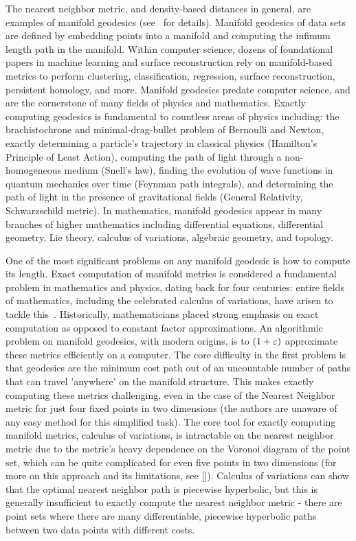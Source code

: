 The nearest neighbor metric, and density-based distances in general, are examples of manifold geodesics (see~\cite{} for details).
Manifold geodesics of data sets are defined by embedding points into a manifold and computing the infimum length path in the manifold.
Within computer science, dozens of foundational papers in machine learning and surface reconstruction rely on manifold-based metrics to perform clustering, classification, regression, surface reconstruction, persistent homology, and more.
Manifold geodesics predate computer science, and are the cornerstone of many fields of physics and mathematics.
Exactly computing geodesics is fundamental to countless areas of physics including: the brachistochrone and minimal-drag-bullet problem of Bernoulli and Newton, exactly determining a particle's trajectory in classical physics (Hamilton's Principle of Least Action), computing the path of light through a non-homogeneous medium (Snell's law), finding the evolution of wave functions in quantum mechanics over time (Feynman path integrals), and determining the path of light in the presence of gravitational fields (General Relativity, Schwarzschild metric).
In mathematics, manifold geodesics appear in many branches of higher mathematics including differential equations, differential geometry, Lie theory, calculus of variations, algebraic geometry, and topology.

One of the most significant problems on any manifold geodesic is how to
compute its length. 
Exact computation of manifold metrics is considered a
fundamental problem in mathematics and physics, dating back for four
centuries: entire fields of mathematics, including the celebrated calculus
of variations, have arisen to tackle this~\cite{}. Historically,
mathematicians placed strong emphasis on exact computation as opposed to
constant factor approximations. An algorithmic problem on manifold
geodesics, with modern origins, is to $(1+\varepsilon)$ approximate these metrics
efficiently on a computer. The core difficulty in the first problem is that
geodesics are the minimum cost path out of an uncountable number of paths
that can travel 'anywhere' on the manifold structure. This makes exactly
computing these metrics challenging, even in the case of the Nearest
Neighbor metric for just four fixed points in two dimensions (the authors
are unaware of any easy method for this simplified task).
The core tool for exactly
computing manifold metrics, calculus of variations, is intractable on the
nearest neighbor metric due to the metric's heavy dependence on the Voronoi
diagram of the point set, which can be quite complicated for even five
points in two dimensions (for more on this approach and its limitations,
see []). Calculus of variations can show that the optimal nearest neighbor
path is piecewise hyperbolic, but this is generally insufficient to exactly
compute the nearest neighbor metric - there are point sets where there are
many differentiable, piecewise hyperbolic paths between two data points with
different costs.


